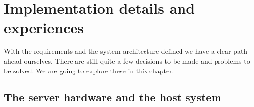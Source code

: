 %

\chapter{Implementation details and experiences \label{ch5}}

With the requirements and the system architecture defined we have a clear path
ahead ourselves. There are still quite a few decisions to be made and problems
to be solved. We are going to explore these in this chapter.

\section{The server hardware and the host system}

